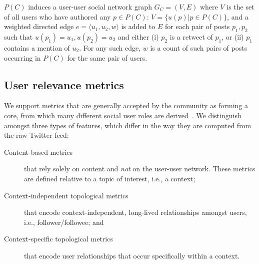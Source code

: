$P(C)$ induces a user-user social network graph $G_C = (V,E)$ where $V$ is the set of all users who have authored any $p \in P(C)$: 
$V = \{ u(p) | p \in P(C) \}$, and a weighted directed edge $e = \langle u_1, u_2, w \rangle$ is added to $E$ for each pair of posts $p_1, p_2$ such that $u(p_1) = u_1, u(p_2) = u_2$ and 
either (i) $p_2$ is a retweet of $p_1$, or (ii) $p_1$ contains a mention of $u_2$.
For any such edge, $w$ is a count of such pairs of posts occurring in $P(C)$ for the same pair of users.

\subsection{User relevance metrics}  \label{sec:metrics}

We support metrics that are generally accepted by the community as forming a core, from which many different social user roles are derived~\cite{RIQUELME2016949}. 
We distinguish amongst three types of features, which differ in the way they are computed from the raw Twitter feed:
\begin{description}
	\item[Content-based metrics] that rely solely on content and \textit{not} on the user-user network. These metrics are defined relative to a topic of interest, i.e., a context;
	\item[Context-independent topological metrics] that encode context-independent, long-lived relationships amongst users, i.e., follower/followee; and 
	\item[Context-specific topological metrics] that encode user relationships that occur specifically within a context.
\end{description}

